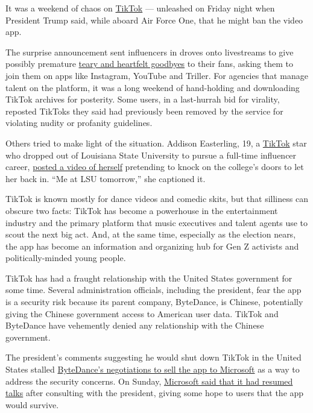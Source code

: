 It was a weekend of chaos on
\href{https://www.nytimes.com/2020/08/03/technology/trump-tiktok-microsoft.html}{TikTok}
--- unleashed on Friday night when President Trump said, while aboard
Air Force One, that he might ban the video app.

The surprise announcement sent influencers in droves onto livestreams to
give possibly premature
\href{https://twitter.com/iamaliceophelia/status/1289402462957273088}{teary
and heartfelt goodbyes} to their fans, asking them to join them on apps
like Instagram, YouTube and Triller. For agencies that manage talent on
the platform, it was a long weekend of hand-holding and downloading
TikTok archives for posterity. Some users, in a last-hurrah bid for
virality, reposted TikToks they said had previously been removed by the
service for violating nudity or profanity guidelines.

Others tried to make light of the situation. Addison Easterling, 19, a
\href{https://www.nytimes.com/2020/08/03/technology/trump-tiktok-microsoft.html}{TikTok}
star who dropped out of Louisiana State University to pursue a full-time
influencer career, \href{https://vm.tiktok.com/J2T9X8K/}{posted a video
of herself} pretending to knock on the college's doors to let her back
in. ``Me at LSU tomorrow,'' she captioned it.

TikTok is known mostly for dance videos and comedic skits, but that
silliness can obscure two facts: TikTok has become a powerhouse in the
entertainment industry and the primary platform that music executives
and talent agents use to scout the next big act. And, at the same time,
especially as the election nears, the app has become an information and
organizing hub for Gen Z activists and politically-minded young people.

TikTok has had a fraught relationship with the United States government
for some time. Several administration officials, including the
president, fear the app is a security risk because its parent company,
ByteDance, is Chinese, potentially giving the Chinese government access
to American user data. TikTok and ByteDance have vehemently denied any
relationship with the Chinese government.

The president's comments suggesting he would shut down TikTok in the
United States stalled
\href{https://www.nytimes.com/2020/08/03/technology/tiktok-trump-sale-microsoft.html}{ByteDance's
negotiations to sell the app to Microsoft} as a way to address the
security concerns. On Sunday,
\href{https://www.nytimes.com/2020/08/02/business/economy/trump-tiktok-china-national-security.html}{Microsoft
said that it had resumed talks} after consulting with the president,
giving some hope to users that the app would survive.

